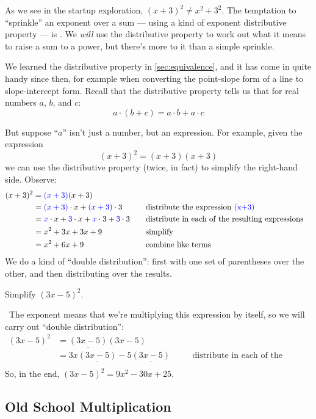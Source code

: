 As we see in the startup exploration, $(x + 3)^2 \neq x^2 + 3^2$. The temptation to ``sprinkle'' an exponent over a sum --- using a kind of exponent distributive property --- is \evilandwrong. We \textit{will} use the distributive property to work out what it means to raise a sum to a power, but there's more to it than a simple sprinkle.

We learned the distributive property in \cref{sec:equivalence}, and it has come in quite handy since then, for example when converting the point-slope form of a line to slope-intercept form. Recall that the distributive property tells us that for real numbers $a$, $b$, and $c$:
\[a \cdot (b+c) = a\cdot b + a\cdot c\]

But suppose ``$a$'' isn't just a number, but an expression. For example, given the expression
\[(x+3)^2 = (x+3)(x+3)\]
we can use the distributive property (twice, in fact) to simplify the right-hand side. Observe:
\[\begin{aligned}
(x+3)^2
&= {\color{blue}(x+3)}{(x+3)}
\\
&= {\color{blue}(x+3)} \cdot x + {\color{blue}(x+3)} \cdot 3
&& \quad\text{distribute the expression {\color{blue}(x+3)}}
\\
&= {\color{blue}x} \cdot x + {\color{blue}3} \cdot x + {\color{blue}x} \cdot 3 + {\color{blue}3} \cdot 3
&& \quad\text{distribute in each of the resulting expressions}
\\
&= x^2 + 3x + 3x + 9
&& \quad\text{simplify}
\\
&= x^2 + 6x + 9
&& \quad\text{combine like terms}
\end{aligned}\]
We do a kind of ``double distribution'': first with one set of parentheses over the other, and then distributing over the results.

\begin{boxedex}
Simplify $(3x-5)^2$.

\exsoln\ The exponent means that we're multiplying this expression by itself, so we will carry out ``double distribution'':
\[\begin{aligned}
(3x-5)^2
&= \underline{(3x-5)}(3x-5)
\\
&= 3x\underline{(3x-5)} - 5\underline{(3x-5)}
&& \quad\text{distribute in each of the resulting expressions}
\\
\end{aligned}\]
So, in the end, $(3x-5)^2 = 9x^2 - 30x + 25$.
\end{boxedex}

\subsection{Old School Multiplication}

